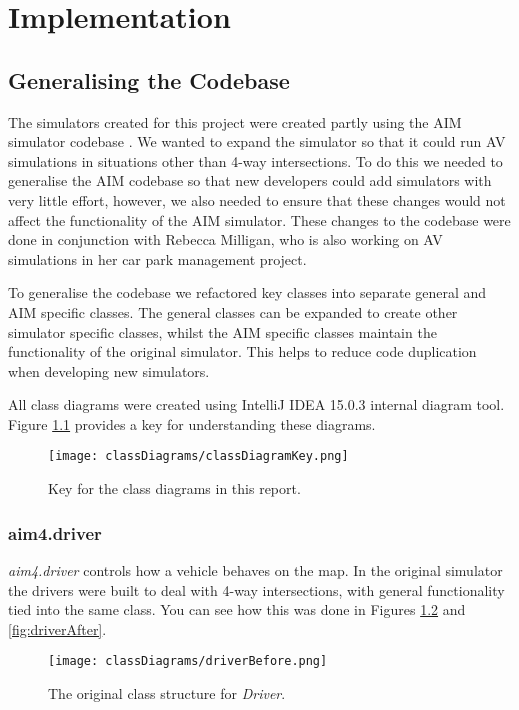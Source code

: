 \chapter{Implementation}
\label{cha:Implementation}

\section{Generalising the Codebase}
\label{sec:Generalising the Codebase}
The simulators created for this project were created partly using the AIM simulator codebase \citep{AIMWebsite}. We wanted to expand the simulator so that it could run AV simulations in situations other than 4-way intersections. To do this we needed to generalise the AIM codebase so that new developers could add simulators with very little effort, however, we also needed to ensure that these changes would not affect the functionality of the AIM simulator. These changes to the codebase were done in conjunction with Rebecca Milligan, who is also working on AV simulations in her car park management project.

To generalise the codebase we refactored key classes into separate general and AIM specific classes. The general classes can be expanded to create other simulator specific classes, whilst the AIM specific classes maintain the functionality of the original simulator. This helps to reduce code duplication when developing new simulators.

All class diagrams were created using IntelliJ IDEA 15.0.3 internal diagram tool. Figure \ref{fig:classDiagramKey} provides a key for understanding these diagrams.

\begin{figure}[htb]
\texttt{[image: classDiagrams/classDiagramKey.png]}
\caption{Key for the class diagrams in this report.}
\label{fig:classDiagramKey}
\end{figure}

\subsection{aim4.driver}
\label{subsec:aim4.driver}
\emph{aim4.driver} controls how a vehicle behaves on the map. In the original simulator the drivers were built to deal with 4-way intersections, with general functionality tied into the same class. You can see how this was done in Figures \ref{fig:driverBefore} and \ref{fig:driverAfter}.

\begin{figure}[htb]
\texttt{[image: classDiagrams/driverBefore.png]}
\caption{The original class structure for \emph{Driver}.}
\label{fig:driverBefore}
\end{figure}

